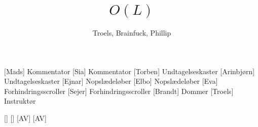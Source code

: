 \documentclass[a4paper,11pt]{article}
\title{$O(L)$}
\author{Troels, Brainfuck, Phillip}
\begin{document}
\maketitle

\begin{roles}
  [Mads] Kommentator
  [Sia] Kommentator
  [Torben] Undtagelseskaster
  [Arinbjørn] Undtagelseskaster
  [Ejnar] Nopslædeløber
  [Elbo] Nopslædeløber
  [Eva] Forhindringsscroller
  [Sejer] Forhindringsscroller
  [Brandt] Dommer
  [Troels] Instruktør
\end{roles}

\begin{props}
  []
  []
  [AV]
  [AV]
\end{props}
\end{document}
